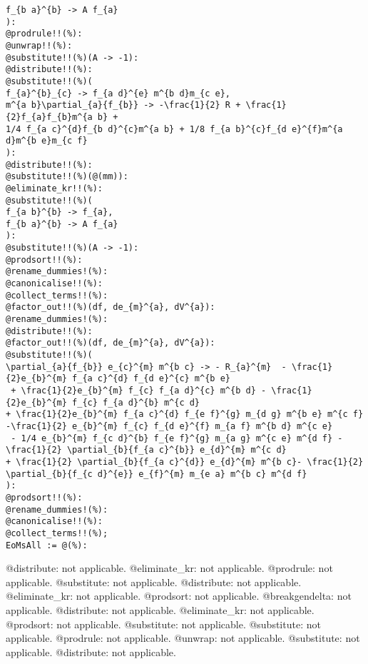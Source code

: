 \documentclass[11pt]{article}
\begin{document}
{\begin{verbatim}
f_{b a}^{b} -> A f_{a}
):
@prodrule!!(%):
@unwrap!!(%):
@substitute!!(%)(A -> -1):
@distribute!!(%):
@substitute!!(%)(
f_{a}^{b}_{c} -> f_{a d}^{e} m^{b d}m_{c e},
m^{a b}\partial_{a}{f_{b}} -> -\frac{1}{2} R + \frac{1}{2}f_{a}f_{b}m^{a b} + 
1/4 f_{a c}^{d}f_{b d}^{c}m^{a b} + 1/8 f_{a b}^{c}f_{d e}^{f}m^{a d}m^{b e}m_{c f}
):
@distribute!!(%):
@substitute!!(%)(@(mm)):
@eliminate_kr!!(%):
@substitute!!(%)(
f_{a b}^{b} -> f_{a},
f_{b a}^{b} -> A f_{a}
):
@substitute!!(%)(A -> -1):
@prodsort!!(%):
@rename_dummies!(%):
@canonicalise!!(%):
@collect_terms!!(%):
@factor_out!!(%)(df, de_{m}^{a}, dV^{a}):
@rename_dummies!(%):
@distribute!!(%):
@factor_out!!(%)(df, de_{m}^{a}, dV^{a}):
@substitute!!(%)(
\partial_{a}{f_{b}} e_{c}^{m} m^{b c} -> - R_{a}^{m}  - \frac{1}{2}e_{b}^{m} f_{a c}^{d} f_{d e}^{c} m^{b e}
 + \frac{1}{2}e_{b}^{m} f_{c} f_{a d}^{c} m^{b d} - \frac{1}{2}e_{b}^{m} f_{c} f_{a d}^{b} m^{c d} 
+ \frac{1}{2}e_{b}^{m} f_{a c}^{d} f_{e f}^{g} m_{d g} m^{b e} m^{c f} -\frac{1}{2} e_{b}^{m} f_{c} f_{d e}^{f} m_{a f} m^{b d} m^{c e}
 - 1/4 e_{b}^{m} f_{c d}^{b} f_{e f}^{g} m_{a g} m^{c e} m^{d f} - \frac{1}{2} \partial_{b}{f_{a c}^{b}} e_{d}^{m} m^{c d} 
+ \frac{1}{2} \partial_{b}{f_{a c}^{d}} e_{d}^{m} m^{b c}- \frac{1}{2} \partial_{b}{f_{c d}^{e}} e_{f}^{m} m_{e a} m^{b c} m^{d f}
):
@prodsort!!(%):
@rename_dummies!(%):
@canonicalise!!(%):
@collect_terms!!(%);
EoMsAll := @(%):
\end{verbatim}}
@distribute: not applicable.
@eliminate\_kr: not applicable.
@prodrule: not applicable.
@substitute: not applicable.
@distribute: not applicable.
@eliminate\_kr: not applicable.
@prodsort: not applicable.
@breakgendelta: not applicable.
@distribute: not applicable.
@eliminate\_kr: not applicable.
@prodsort: not applicable.
@substitute: not applicable.
@substitute: not applicable.
@prodrule: not applicable.
@unwrap: not applicable.
@substitute: not applicable.
@distribute: not applicable.
\end{document}

